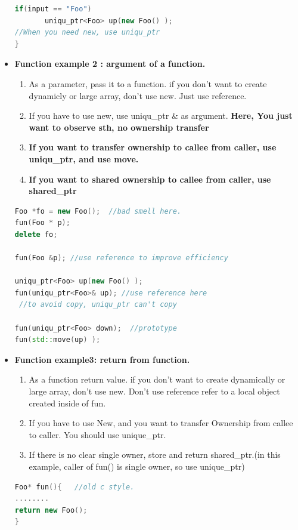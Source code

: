 \documentclass[a4paper,12pt,twoside]{book}
\begin{document}
\begin{itemize}
\begin{lstlisting}[frame=single, language=c++]
if(input == "Foo")
       uniqu_ptr<Foo> up(new Foo() );
//When you need new, use uniqu_ptr
}
\end{lstlisting}


\item \textbf{Function example 2 : argument of a function.}
\begin{enumerate}
\item As a parameter, pass it to a function. if you don't want to create dynamicly or large array, don't use new. Just use reference.
\item If you have to use new,  use uniqu\_ptr \& as argument.  \textbf{Here, You just want to observe sth, no ownership transfer}
\item \textbf{If you want to transfer ownership to callee from caller, use uniqu\_ptr, and use move.}
\item \textbf{If you want to shared ownership to callee from caller, use shared\_ptr}
\end{enumerate}

\begin{lstlisting}[frame=single, language=c++]
Foo *fo = new Foo();  //bad smell here.
fun(Foo * p);
delete fo;

fun(Foo &p); //use reference to improve efficiency

uniqu_ptr<Foo> up(new Foo() );
fun(uniqu_ptr<Foo>& up); //use reference here
 //to avoid copy, uniqu_ptr can't copy

fun(uniqu_ptr<Foo> down);  //prototype
fun(std::move(up) );
\end{lstlisting}

\item \textbf{Function example3: return from function.}
\begin{enumerate}
\item As a function return value. if you don't want to create dynamically or large array, don't use new. Don't  use reference refer to a local object created inside of fun.
\item If you have to use New, and you want to transfer Ownership from callee to caller. You should use unique\_ptr.
\item If there is no clear single owner, store and return shared\_ptr.(in this example, caller of fun() is single owner, so use unique\_ptr)
\end{enumerate}

\begin{lstlisting}[frame=single, language=c++]
Foo* fun(){   //old c style.
........
return new Foo();
}


\end{lstlisting}
\end{itemize}
\end{document}
